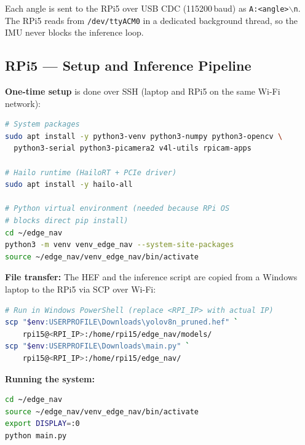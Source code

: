 \documentclass[journal, onecolumn]{IEEEtran}
\begin{document}
Each angle is sent to the RPi5 over USB CDC (115200\,baud) as \texttt{A:<angle>$\backslash$n}. The RPi5 reads from \texttt{/dev/ttyACM0} in a dedicated background thread, so the IMU never blocks the inference loop.

\subsection{RPi5 — Setup and Inference Pipeline}
\label{sec:rpi5}

\textbf{One-time setup} is done over SSH (laptop and RPi5 on the same Wi-Fi network):

\begin{lstlisting}[caption={RPi5 system package and Hailo runtime installation},label=lst:setup,language=bash]
# System packages
sudo apt install -y python3-venv python3-numpy python3-opencv \
  python3-serial python3-picamera2 v4l-utils rpicam-apps

# Hailo runtime (HailoRT + PCIe driver)
sudo apt install -y hailo-all

# Python virtual environment (needed because RPi OS
# blocks direct pip install)
cd ~/edge_nav
python3 -m venv venv_edge_nav --system-site-packages
source ~/edge_nav/venv_edge_nav/bin/activate
\end{lstlisting}

\textbf{File transfer:} The HEF and the inference script are copied from a Windows laptop to the RPi5 via SCP over Wi-Fi:

\begin{lstlisting}[caption={SCP transfer of HEF and inference script to RPi5},label=lst:scp,language=bash]
# Run in Windows PowerShell (replace <RPI_IP> with actual IP)
scp "$env:USERPROFILE\Downloads\yolov8n_pruned.hef" `
    rpi15@<RPI_IP>:/home/rpi15/edge_nav/models/
scp "$env:USERPROFILE\Downloads\main.py" `
    rpi15@<RPI_IP>:/home/rpi15/edge_nav/
\end{lstlisting}

\textbf{Running the system:}

\begin{lstlisting}[caption={Launching the inference and mapping system on RPi5},label=lst:run,language=bash]
cd ~/edge_nav
source ~/edge_nav/venv_edge_nav/bin/activate
export DISPLAY=:0
python main.py
\end{lstlisting}
\end{document}
